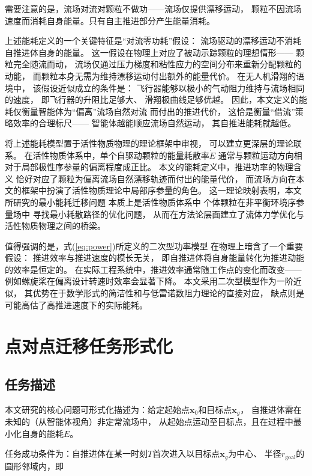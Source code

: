 需要注意的是，流场对流对颗粒不做功——流场仅提供漂移运动，
颗粒不因流场速度而消耗自身能量。只有自主推进部分产生能量消耗。

上述能耗定义的一个关键特征是“对流零功耗”假设：
流场驱动的漂移运动不消耗自推进体自身的能量。
这一假设在物理上对应了被动示踪颗粒的理想情形——
颗粒完全随流而动，
流场仅通过压力梯度和粘性应力的空间分布来重新分配颗粒的动能，
而颗粒本身无需为维持漂移运动付出额外的能量代价。
在无人机滑翔的语境中，
该假设近似成立的条件是：
飞行器能够以极小的气动阻力维持与流场相同的速度，
即飞行器的升阻比足够大、
滑翔极曲线足够优越。
因此，本文定义的能耗仅衡量智能体为“偏离”流场自然对流
而付出的推进代价，
这恰是衡量“借流”策略效率的合理标尺——
智能体越能顺应流场自然运动，
其自推进能耗就越低。

将上述能耗模型置于活性物质物理的理论框架中审视，
可以建立更深层的理论联系。
在活性物质体系中，单个自驱动颗粒的能量耗散率$\dot{E}$
通常与颗粒运动方向相对于局部极性序参量的偏离程度成正比。
本文的能耗定义中，推进功率的物理含义
恰好对应了颗粒为偏离流场自然漂移轨迹而付出的能量代价，
而流场方向在本文的框架中扮演了活性物质理论中局部序参量的角色。
这一理论映射表明，本文所研究的最小能耗迁移问题
本质上是活性物质体系中
个体颗粒在非平衡环境序参量场中
寻找最小耗散路径的优化问题，
从而在方法论层面建立了流体力学优化与活性物质物理之间的桥梁。

值得强调的是，式(\ref{eq:power})所定义的二次型功率模型
在物理上暗含了一个重要假设：
推进效率与推进速度的模长无关，
即自推进体将自身能量转化为推进动能的效率是恒定的。
在实际工程系统中，推进效率通常随工作点的变化而改变——
例如螺旋桨在偏离设计转速时效率会显著下降。
本文采用二次型模型作为一阶近似，
其优势在于数学形式的简洁性和与低雷诺数阻力理论的直接对应，
缺点则是可能高估了高推进速度下的实际能耗。


\section{点对点迁移任务形式化}

\subsection{任务描述}

本文研究的核心问题可形式化描述为：给定起始点$\mathbf{x}_0$和目标点$\mathbf{x}_g$，
自推进体需在未知的（从智能体视角）非定常流场中，
从起始点运动至目标点，且在过程中最小化自身的能耗$E$。

任务成功条件为：自推进体在某一时刻$T$首次进入以目标点$\mathbf{x}_g$为中心、
半径$r_{\text{goal}}$的圆形邻域内，即

